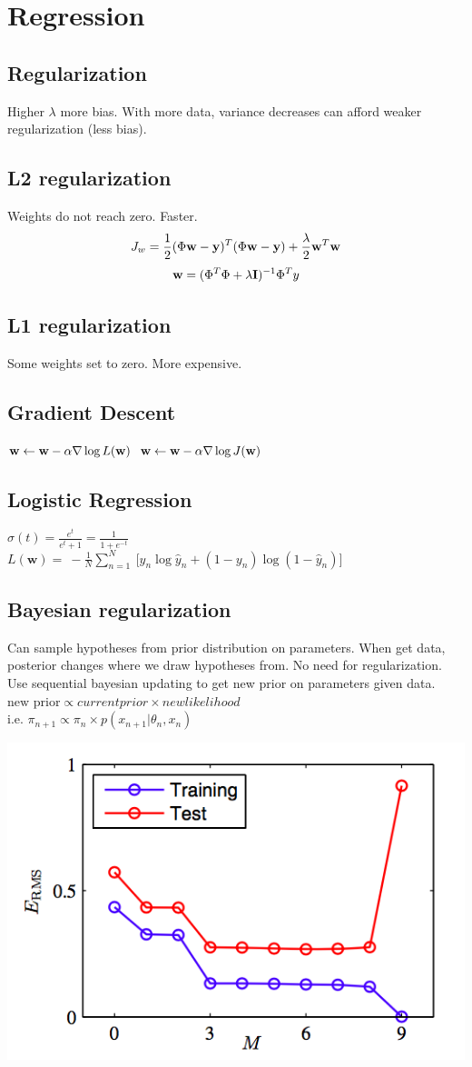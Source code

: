 
\section{Regression}
\subsection{Regularization}
Higher $\lambda$ more bias. With more data, variance decreases can afford weaker regularization (less bias).
\subsection{L2 regularization}
Weights do not reach zero. Faster.
$$J_w = \frac{1}{2}(\Phi\mathbf{w} - \mathbf{y})^T(\Phi \mathbf{w} - \mathbf{y}) + \frac{\lambda}{2}\mathbf{w}^T\mathbf{w}$$
$$\mathbf{w} = (\Phi^T\Phi + \lambda \mathbf{I})^{-1}\Phi^Ty$$
\subsection{L1 regularization}
Some weights set to zero. More expensive. 
\subsection{Gradient Descent}
$\mathbf{w} \leftarrow \mathbf{w} - \alpha \nabla \log L(\mathbf{w})$
$\mathbf{w} \leftarrow \mathbf{w} - \alpha \nabla \log J(\mathbf{w})$
\subsection{Logistic Regression}
$\sigma (t) = \frac{e^t}{e^t+1} = \frac{1}{1+e^{-t}}$
$L(\mathbf{w}) =\ -\frac1N\sum_{n=1}^N\ \bigg[y_n  \log \hat y_n + (1 - y_n)  \log (1 - \hat y_n)\bigg]$

\subsection{Bayesian regularization}
Can sample hypotheses from prior distribution on parameters. When get data, posterior changes where we draw hypotheses from. No need for regularization. Use sequential bayesian updating to get new prior on parameters given data. $\text{new prior} \propto {current prior} \times {new likelihood}$ \\
i.e. $\pi_{n+1} \propto \pi_{n} \times p(x_{n+1} \vert \theta_n, x_n)$


\includegraphics[width=0.5\linewidth]{error.png}


